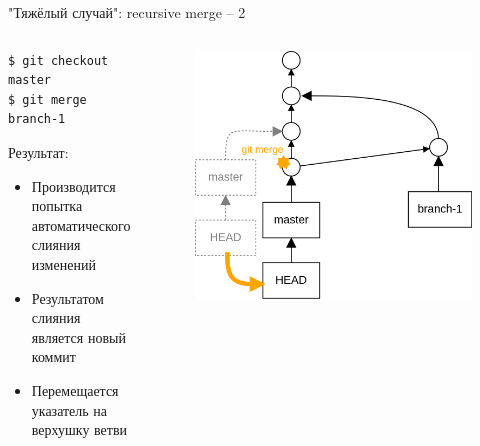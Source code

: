 \documentclass[presentation]{beamer}
\begin{document}
\begin{frame}[fragile]{"Тяжёлый случай": recursive merge -- 2}
  \begin{columns}
    \begin{column}{.4\textwidth}
\begin{verbatim}
$ git checkout master
$ git merge branch-1
\end{verbatim}
      Результат:
      \begin{itemize}
      \item Производится попытка автоматического слияния изменений
      \item Результатом слияния является новый коммит
      \item Перемещается указатель на верхушку ветви
      \end{itemize}
      \end{column}
      \begin{column}{.6\textwidth}
        \begin{figure}[htb]
          \centering
          \includegraphics[height=.7\textheight]{git-operation-merge-2-2}
        \end{figure}
      \end{column}
    \end{columns}
\end{frame}
\end{document}

